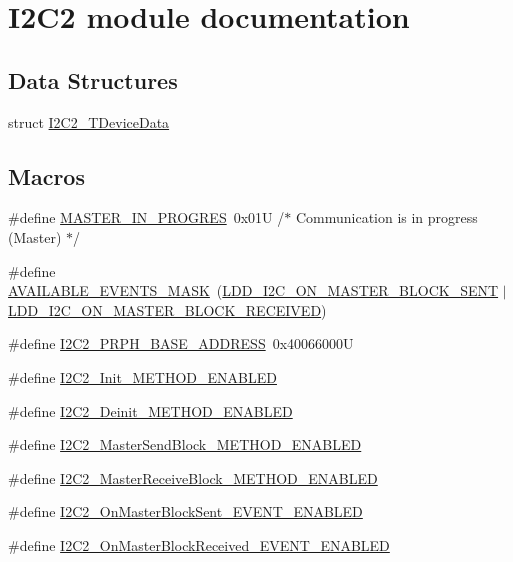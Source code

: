 \hypertarget{group___i2_c2__module}{}\section{I2\+C2 module documentation}
\label{group___i2_c2__module}
\subsection*{Data Structures}
\begin{DoxyCompactItemize}
\item 
struct \hyperlink{struct_i2_c2___t_device_data}{I2\+C2\+\_\+\+T\+Device\+Data}
\end{DoxyCompactItemize}
\subsection*{Macros}
\begin{DoxyCompactItemize}
\item 
\#define \hyperlink{group___i2_c2__module_ga75b75f2a24a05753b06756bdef0e704e}{M\+A\+S\+T\+E\+R\+\_\+\+I\+N\+\_\+\+P\+R\+O\+G\+R\+ES}~0x01\+U  /$\ast$ Communication is in progress (\+Master) $\ast$/
\item 
\#define \hyperlink{group___i2_c2__module_ga5f04a8830cd52a3ffa1678d113f31aee}{A\+V\+A\+I\+L\+A\+B\+L\+E\+\_\+\+E\+V\+E\+N\+T\+S\+\_\+\+M\+A\+SK}~(\hyperlink{group___p_e___types__module_ga187d9ac85a01b75a8f871d72b9cd5fe3}{L\+D\+D\+\_\+\+I2\+C\+\_\+\+O\+N\+\_\+\+M\+A\+S\+T\+E\+R\+\_\+\+B\+L\+O\+C\+K\+\_\+\+S\+E\+NT} $\vert$ \hyperlink{group___p_e___types__module_gac4694457514889498da89fa1afe27412}{L\+D\+D\+\_\+\+I2\+C\+\_\+\+O\+N\+\_\+\+M\+A\+S\+T\+E\+R\+\_\+\+B\+L\+O\+C\+K\+\_\+\+R\+E\+C\+E\+I\+V\+ED})
\item 
\#define \hyperlink{group___i2_c2__module_ga4b1cbef8ecbddd4c07fd4b26fb06541e}{I2\+C2\+\_\+\+P\+R\+P\+H\+\_\+\+B\+A\+S\+E\+\_\+\+A\+D\+D\+R\+E\+SS}~0x40066000U
\item 
\#define \hyperlink{group___i2_c2__module_ga81e4694b395dedec69c963921cf84b0e}{I2\+C2\+\_\+\+Init\+\_\+\+M\+E\+T\+H\+O\+D\+\_\+\+E\+N\+A\+B\+L\+ED}
\item 
\#define \hyperlink{group___i2_c2__module_ga9e8dc9e36320642cc1e09e9364470975}{I2\+C2\+\_\+\+Deinit\+\_\+\+M\+E\+T\+H\+O\+D\+\_\+\+E\+N\+A\+B\+L\+ED}
\item 
\#define \hyperlink{group___i2_c2__module_ga89fa8ec2abc79026b46ce263b60a08ee}{I2\+C2\+\_\+\+Master\+Send\+Block\+\_\+\+M\+E\+T\+H\+O\+D\+\_\+\+E\+N\+A\+B\+L\+ED}
\item 
\#define \hyperlink{group___i2_c2__module_gad9d3afb8b9efa6e78f0675448fa877ea}{I2\+C2\+\_\+\+Master\+Receive\+Block\+\_\+\+M\+E\+T\+H\+O\+D\+\_\+\+E\+N\+A\+B\+L\+ED}
\item 
\#define \hyperlink{group___i2_c2__module_ga6ed36d7f0c201b7b3a9d7f52af5d91e2}{I2\+C2\+\_\+\+On\+Master\+Block\+Sent\+\_\+\+E\+V\+E\+N\+T\+\_\+\+E\+N\+A\+B\+L\+ED}
\item 
\#define \hyperlink{group___i2_c2__module_ga59195c0edc0b4f86b372c23a424b03d9}{I2\+C2\+\_\+\+On\+Master\+Block\+Received\+\_\+\+E\+V\+E\+N\+T\+\_\+\+E\+N\+A\+B\+L\+ED}
\end{DoxyCompactItemize}
